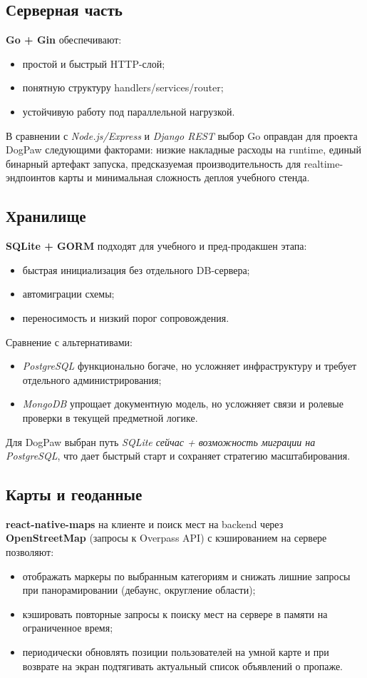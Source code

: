 \documentclass[12pt,a4paper]{article}
\begin{document}
\subsection{Серверная часть}

\textbf{Go + Gin} обеспечивают:
\begin{itemize}
  \item простой и быстрый HTTP-слой;
  \item понятную структуру handlers/services/router;
  \item устойчивую работу под параллельной нагрузкой.
\end{itemize}

В сравнении с \textit{Node.js/Express} и \textit{Django REST} выбор Go оправдан для проекта DogPaw следующими факторами: низкие накладные расходы на runtime, единый бинарный артефакт запуска, предсказуемая производительность для realtime-эндпоинтов карты и минимальная сложность деплоя учебного стенда.

\subsection{Хранилище}

\textbf{SQLite + GORM} подходят для учебного и пред-продакшен этапа:
\begin{itemize}
  \item быстрая инициализация без отдельного DB-сервера;
  \item автомиграции схемы;
  \item переносимость и низкий порог сопровождения.
\end{itemize}

Сравнение с альтернативами:
\begin{itemize}
  \item \textit{PostgreSQL} функционально богаче, но усложняет инфраструктуру и требует отдельного администрирования;
  \item \textit{MongoDB} упрощает документную модель, но усложняет связи и ролевые проверки в текущей предметной логике.
\end{itemize}
Для DogPaw выбран путь \textit{SQLite сейчас + возможность миграции на PostgreSQL}, что дает быстрый старт и сохраняет стратегию масштабирования.

\subsection{Карты и геоданные}

\textbf{react-native-maps} на клиенте и поиск мест на backend через \textbf{OpenStreetMap} (запросы к Overpass API) с кэшированием на сервере позволяют:
\begin{itemize}
  \item отображать маркеры по выбранным категориям и снижать лишние запросы при панорамировании (дебаунс, округление области);
  \item кэшировать повторные запросы к поиску мест на сервере в памяти на ограниченное время;
  \item периодически обновлять позиции пользователей на умной карте и при возврате на экран подтягивать актуальный список объявлений о пропаже.
\end{itemize}
\end{document}
